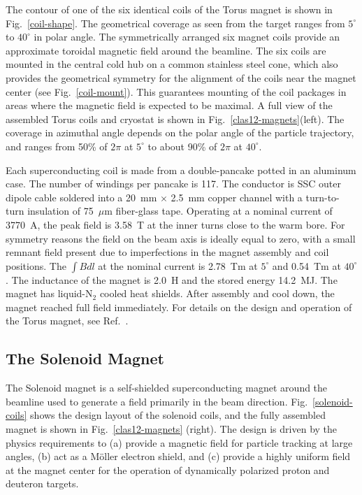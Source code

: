 \documentclass[final,3p,twocolumn]{elsarticle}
\begin{document}
The contour of one of the six identical coils of the Torus magnet is shown in Fig.~\ref{coil-shape}. The geometrical
coverage as seen from the target ranges from $5^\circ$ to $40^\circ$ in polar angle. The symmetrically arranged six
magnet coils provide an approximate toroidal magnetic field around the beamline. The six coils are mounted in the
central cold hub on a common stainless steel cone, which also provides the geometrical symmetry for the alignment of
the coils near the magnet center (see Fig.~\ref{coil-mount}). This guarantees mounting of the coil packages in areas
where the magnetic field is expected to be maximal. A full view of the assembled Torus coils and cryostat is shown in
Fig.~\ref{clas12-magnets}(left). The coverage in azimuthal angle depends on the polar angle of the particle trajectory,
and ranges from 50\% of $2\pi$ at $5^\circ$ to about 90\% of $2\pi$ at $40^\circ$.

Each superconducting coil is made from a double-pancake potted in an aluminum case. The number of windings per
pancake is 117. The conductor is SSC outer dipole cable soldered into a 20~mm $\times$ 2.5~mm copper channel with
a turn-to-turn insulation of 75~$\mu$m fiber-glass tape. Operating at a nominal current of 3770~A, the peak field is
3.58~T at the inner turns close to the warm bore. For symmetry reasons the field on the beam axis is ideally equal to
zero, with a small remnant field present due to imperfections in the magnet assembly and coil positions. The $\int {Bdl}$
at the nominal current is 2.78~Tm at $5^\circ$ and 0.54~Tm at $40^\circ$. The inductance of the magnet is 2.0~H
and the stored energy 14.2~MJ. The magnet has liquid-N$_2$ cooled heat shields. After assembly and cool down,
the magnet reached full field immediately. For details on the design and operation of the Torus magnet, see
Ref.~\cite{clas12-magnets}.

\subsection{The Solenoid Magnet}

The Solenoid magnet is a self-shielded superconducting magnet around the beamline used to generate a field primarily
in the beam direction. Fig.~\ref{solenoid-coils} shows the design layout of the solenoid coils, and the fully assembled
magnet is shown in Fig.~\ref{clas12-magnets} (right). The design is driven by the physics requirements to (a) provide
a magnetic field for particle tracking at large angles, (b) act as a M\"oller electron shield, and (c) provide a highly
uniform field at the magnet center for the operation of dynamically polarized proton and deuteron targets.
\end{document}
